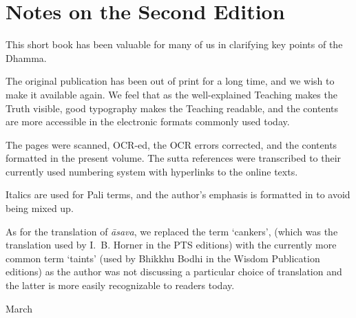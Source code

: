 \chapter{Notes on the Second Edition}

This short book has been valuable for many of us in clarifying key points of the Dhamma.

The original publication has been out of print for a long time, and we wish to make it available again.
We feel that as the well-explained Teaching makes the Truth visible, good typography makes the Teaching readable,
and the contents are more accessible in the electronic formats commonly used today.

The pages were scanned, OCR-ed, the OCR errors corrected, and the contents formatted in the present volume.
The sutta references were transcribed to their currently used numbering system with hyperlinks to the online texts.

Italics are used for Pali terms, and the author's emphasis is formatted in  to avoid being mixed up.

As for the translation of \emph{āsava}, we replaced the term `cankers',
(which was the translation used by I.~B. Horner in the PTS editions)
with the currently more common term `taints'
(used by Bhikkhu Bodhi in the Wisdom Publication editions)
as the author was not discussing a particular choice of translation
and the latter is more easily recognizable to readers today.

\bigskip

{ March
\par}

